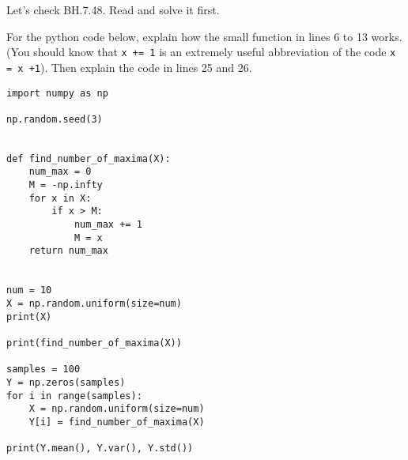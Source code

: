 \documentclass[assignments]{subfiles}
\begin{document}
\begin{exercise}
Let's check  BH.7.48. Read and solve it first.  

For  the python code below, explain how the small function in lines 6 to 13 works. (You should know that \texttt{x += 1} is an extremely useful abbreviation of the code \texttt{x = x +1}). Then explain the code in lines 25 and 26.

\begin{verbatim}
import numpy as np

np.random.seed(3)


def find_number_of_maxima(X):
    num_max = 0
    M = -np.infty
    for x in X:
        if x > M:
            num_max += 1
            M = x
    return num_max


num = 10
X = np.random.uniform(size=num)
print(X)

print(find_number_of_maxima(X))

samples = 100
Y = np.zeros(samples)
for i in range(samples):
    X = np.random.uniform(size=num)
    Y[i] = find_number_of_maxima(X)

print(Y.mean(), Y.var(), Y.std())
\end{verbatim}
\end{exercise}
\end{document}
